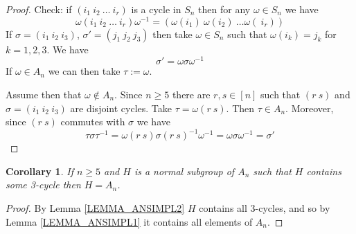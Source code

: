 \documentclass[12pt, letterpaper, oneside]{article}
\theoremstyle{plain}
\newtheorem{corollary}[theorem]{Corollary}
\theoremstyle{definition}
\newcommand{\vs}{\vskip 5mm}
\begin{document}
\vs

\begin{proof}
Check: if $(i_{1} \ i_{2} \ \dots \ i_{r})$ is a cycle in $S_{n}$ then for any 
$\omega\in S_{n}$ we have 
$$\omega(i_{1} \ i_{2} \ \dots \ i_{r})\omega^{-1} = (\omega(i_{1}) \ \omega(i_{2}) \ \dots \omega(\ i_{r}))$$
If $\sigma  = (i_{1} \ i_{2} \ i_{3})$, $\sigma' = (j_{1}\ j_{2}\ j_{3})$ then take $\omega\in S_{n}$
such that $\omega(i_{k}) = j_{k}$ for $k=1, 2, 3$. We have
$$\sigma' = \omega \sigma \omega^{-1}$$
If $\omega\in A_{n}$ we can then take $\tau := \omega$.

Assume then that $\omega\not\in A_{n}$. 
Since $n\geq 5$ there are $r, s\in [n]$ such that $(r \ s)$ and $\sigma = (i_{1} \  i_{2}\ i_{3})$
are disjoint cycles. Take $\tau = \omega (r\ s)$.  Then $\tau \in A_{n}$. Moreover, since 
$(r\ s)$ commutes with $\sigma$ we have
$$\tau\sigma\tau^{-1} =  \omega (r\ s)\sigma(r\ s)^{-1} \omega^{-1} = \omega \sigma \omega^{-1} = \sigma'$$
\end{proof}


\vs\vs

\begin{corollary}
\label{COR_SIMPLE3CYCLE}
If $n\geq 5$ and $H$ is a normal subgroup of $A_{n}$ such that $H$ contains some 3-cycle 
then $H = A_{n}$.
\end{corollary}

\vs

\begin{proof}
By Lemma \ref{LEMMA_ANSIMPL2} $H$  contains all 3-cycles, and so by 
Lemma \ref{LEMMA_ANSIMPL1} it contains all elements of $A_{n}$.
\end{proof}


\vs\vs
\end{document}
